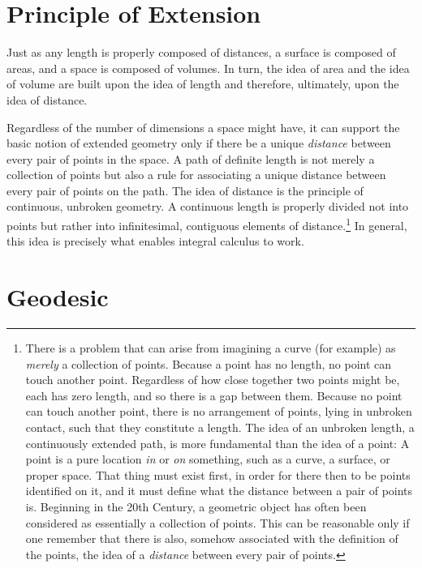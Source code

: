 \section{Principle of Extension}

Just as any length is properly composed of distances, a surface is composed of
areas, and a space is composed of volumes.  In turn, the idea of area and the
idea of volume are built upon the idea of length and therefore, ultimately,
upon the idea of distance.

Regardless of the number of dimensions a space might have, it can support the
basic notion of extended geometry only if there be a unique \emph{distance}
between every pair of points in the space.  A path of definite length is not
merely a collection of points but also a rule for associating a unique distance
between every pair of points on the path.  The idea of distance is the
principle of continuous, unbroken geometry.  A continuous length is properly
divided not into points but rather into infinitesimal, contiguous elements of
distance.\footnote{%
   There is a problem that can arise from imagining a curve (for example) as
   \emph{merely} a collection of points.  Because a point has no length, no
   point can touch another point.  Regardless of how close together two points
   might be, each has zero length, and so there is a gap between them.  Because
   no point can touch another point, there is no arrangement of points, lying
   in unbroken contact, such that they constitute a length.  The idea of an
   unbroken length, a continuously extended path, is more fundamental than the
   idea of a point:  A point is a pure location \emph{in} or \emph{on}
   something, such as a curve, a surface, or proper space.  That thing must
   exist first, in order for there then to be points identified on it, and it
   must define what the distance between a pair of points is.  Beginning in the
   20th Century, a geometric object has often been considered as essentially a
   collection of points.  This can be reasonable only if one remember that
   there is also, somehow associated with the definition of the points, the
   idea of a \emph{distance} between every pair of points.%
}
In general, this idea is precisely what enables integral calculus to work.

\section{Geodesic}

